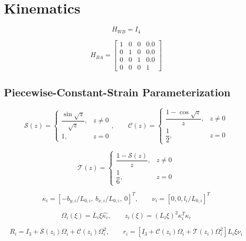 \documentclass[11pt]{article}
\newcommand{\Sfun}{\mathcal{S}}
\newcommand{\Cfun}{\mathcal{C}}
\newcommand{\Tfun}{\mathcal{T}}
\begin{document}
\section{Kinematics}
\begin{equation}
H_{WB}=I_4
\end{equation}

\begin{equation}
H_{BA}=\begin{bmatrix}1 & 0 & 0 & 0.0\\0 & 1 & 0 & 0.0\\0 & 0 & 1 & 0.0\\0 & 0 & 0 & 1\end{bmatrix}\label{eq:mount-transform}
\end{equation}

\subsection{Piecewise-Constant-Strain Parameterization}
\begin{equation}
\Sfun(z)=\begin{cases}\dfrac{\sin\sqrt z}{\sqrt z},&z\ne0\\1,&z=0\end{cases},\qquad \Cfun(z)=\begin{cases}\dfrac{1-\cos\sqrt z}{z},&z\ne0\\\dfrac12,&z=0\end{cases}
\end{equation}

\begin{equation}
\Tfun(z)=\begin{cases}\dfrac{1-\Sfun(z)}{z},&z\ne0\\\dfrac16,&z=0\end{cases}
\end{equation}

\begin{equation}
\kappa_i=[-b_{y,i}/L_{0,i},\ b_{x,i}/L_{0,i},\ 0]^T,\qquad\nu_i=[0,0,l_i/L_{0,i}]^T
\end{equation}

\begin{equation}
\Omega_i(\xi)=L_i\xi\widehat{\kappa_i},\qquad z_i(\xi)=(L_i\xi)^2\kappa_i^T\kappa_i
\end{equation}

\begin{equation}
R_i=I_3+\Sfun(z_i)\Omega_i+\Cfun(z_i)\Omega_i^2,\qquad r_i=\left[I_3+\Cfun(z_i)\Omega_i+\Tfun(z_i)\Omega_i^2\right]L_i\xi\nu_i
\end{equation}
\end{document}
